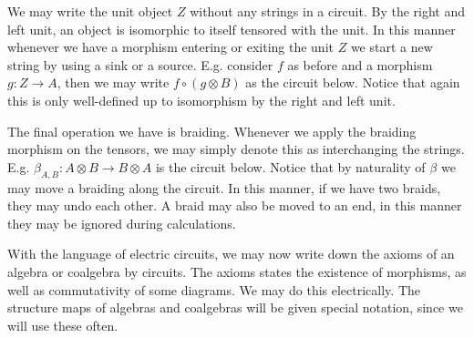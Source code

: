 \documentclass[../thesis.tex]{subfiles}
\begin{document}
            We may write the unit object $Z$ without any strings in a circuit. By the right and left unit, an object is isomorphic to itself tensored with the unit. In this manner whenever we have a morphism entering or exiting the unit $Z$ we start a new string by using a sink or a source. E.g. consider $f$ as before and a morphism $g : Z \rightarrow A$, then we may write $f \circ (g \otimes B)$ as the circuit below. Notice that again this is only well-defined up to isomorphism by the right and left unit.
            \begin{center}
            \end{center}

            The final operation we have is braiding. Whenever we apply the braiding morphism on the tensors, we may simply denote this as interchanging the strings. E.g. $\beta_{A,B} : A \otimes B \rightarrow B \otimes A$ is the circuit below. Notice that by naturality of $\beta$ we may move a braiding along the circuit. In this manner, if we have two braids, they may undo each other. A braid may also be moved to an end, in this manner they may be ignored during calculations.
            \begin{center}
            \end{center}

            With the language of electric circuits, we may now write down the axioms of an algebra or coalgebra by circuits. The axioms states the existence of morphisms, as well as commutativity of some diagrams. We may do this electrically. The structure maps of algebras and coalgebras will be given special notation, since we will use these often.
\end{document}

